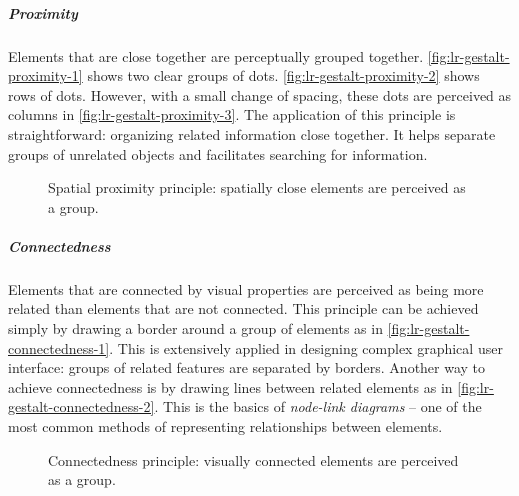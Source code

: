 \subparagraph{Proximity} 
Elements that are close together are perceptually grouped together. \autoref{fig:lr-gestalt-proximity-1} shows two clear groups of dots. \autoref{fig:lr-gestalt-proximity-2} shows rows of dots. However, with a small change of spacing, these dots are perceived as columns in \autoref{fig:lr-gestalt-proximity-3}. The application of this principle is straightforward: organizing related information close together. It helps separate groups of unrelated objects and facilitates searching for information.

\begin{figure}[!htb]
	\centering
	\hfill
	\hfill
	\label{fig:lr-gestalt-proximity}
	\caption{Spatial proximity principle: spatially close elements are perceived as a group. }
\end{figure}

\subparagraph{Connectedness} 
Elements that are connected by visual properties are perceived as being more related than elements that are not connected. This principle can be achieved simply by drawing a border around a group of elements as in \autoref{fig:lr-gestalt-connectedness-1}. This is extensively applied in designing complex graphical user interface: groups of related features are separated by borders. Another way to achieve connectedness is by drawing lines between related elements as in \autoref{fig:lr-gestalt-connectedness-2}. This is the basics of \emph{node-link diagrams} -- one of the most common methods of representing relationships between elements.

\begin{figure}[!htb]
	\centering
	\hfill
	\caption{Connectedness principle: visually connected elements are perceived as a group. }
	\label{fig:lr-gestalt-connectedness}
\end{figure}

